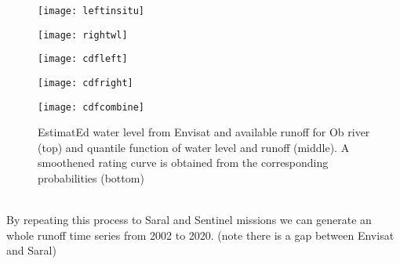 \begin{figure}[htbp]
	\centering
	\begin{minipage}[t]{0.45\textwidth}
		\centering
		\texttt{[image: leftinsitu]} %
	\end{minipage}
	\begin{minipage}[t]{0.45\textwidth}
		\centering
		\texttt{[image: rightwl]} %
	\end{minipage}
	\begin{minipage}[t]{0.45\textwidth}
		\centering
		\texttt{[image: cdfleft]} %
	\end{minipage}
	\begin{minipage}[t]{0.45\textwidth}
		\centering
		\texttt{[image: cdfright]} %
	\end{minipage}
	\begin{minipage}[t]{0.45\textwidth}
		\centering
		\texttt{[image: cdfcombine]} %
	\end{minipage}
	\caption{EstimatEd water level from Envisat and available runoff for Ob river (top) and quantile function of water level and runoff (middle). A smoothened rating curve is obtained from the corresponding probabilities (bottom)}
	\label{fig:wltodischarge}
\end{figure}\\
By repeating this process to Saral and Sentinel missions we can generate an whole runoff time series from 2002 to 2020. (note there is a gap between Envisat and Saral) 